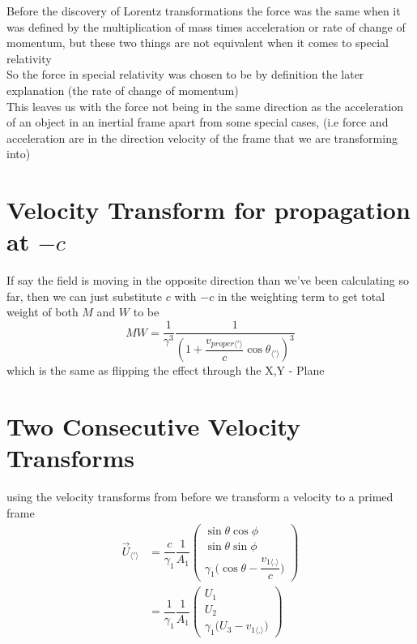 Before the discovery of Lorentz transformations the force was the same when it was defined by the multiplication of mass times acceleration or rate of change of momentum, but these two things are not equivalent when it comes to special relativity\\
So the force in special relativity was chosen to be by definition the later explanation (the rate of change of momentum)\\
This leaves us with the force not being in the same direction as the acceleration of an object in an inertial frame apart from some special cases, (i.e force and acceleration are in the direction velocity of the frame that we are transforming into)

\chapter{Velocity Transform for propagation at \texorpdfstring{$-c$}{TEXT}}

If say the field is moving in the opposite direction than we've been calculating so far, then we can just substitute $c$ with $-c$ in the weighting term to get total weight of both $M$ and $W$ to be
\begin{equation}%
    M W = \dfrac{1}{\gamma^3}\dfrac{1}{\left( 1 + \dfrac{v_{proper\langle ' \rangle}}{c}\cos{\theta_{\langle ' \rangle}} \right)^3}
\end{equation}%
which is the same as flipping the effect through the X,Y - Plane

\chapter{Two Consecutive Velocity Transforms}
using the velocity transforms from before we transform a velocity to a primed frame
\begin{equation}%
    \begin{split}
    \vec{U}_{\langle ' \rangle} 
    &= \dfrac{c}{\gamma_1} \dfrac{1}{A_1} \begin{pmatrix}
    \sin\theta\cos\phi\\ \sin\theta\sin\phi\\ \gamma_1\Big(\cos\theta - \dfrac{v_{1\langle . \rangle}}{c}\Big)
    \end{pmatrix} \\
    &= \dfrac{1}{\gamma_1} \dfrac{1}{A_1} \begin{pmatrix}
    U_1\\ U_2\\ \gamma_1\Big(U_3 - v_{1\langle . \rangle}\Big)
    \end{pmatrix} 
    \end{split}
\end{equation}%

